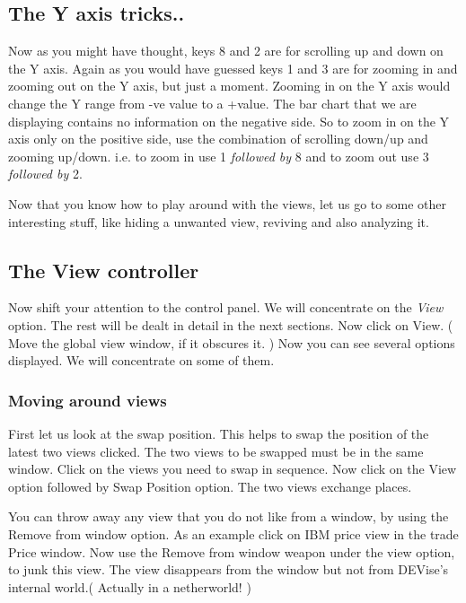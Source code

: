 \subsection{The Y axis tricks..}


	Now as you might have thought, keys 8 and 2 are for scrolling up and down on the Y axis. Again as you would have guessed keys 1 and 3 are for zooming in and zooming out on the Y axis, but just a moment. Zooming in on the Y axis would change the Y range from -ve value to a +value. The bar chart that we are displaying contains no information on the negative side. So to zoom in on the Y axis only on the positive side, use the combination of scrolling down/up and zooming up/down. i.e. to zoom in  use 1 {\em followed by } 8 and to zoom out use 3 {\em followed by } 2.   


	Now that you know how to play around with the views, let us go to some other interesting stuff, like hiding a unwanted view, reviving and also analyzing it.

\subsection{The View controller}

	Now shift your attention to the control panel. We will concentrate on the {\em View } option. The rest will be dealt in detail in the next sections. Now click on View. ( Move the global view window, if it obscures it. ) Now you can see several options displayed. We will concentrate on some of them.

\subsubsection{Moving around views}


	First let us look at the swap position. This helps to swap the position of the latest two views clicked. The two views to be swapped must be in the same window. Click on the views you need to swap in sequence. Now click on the View option followed by Swap Position option. The two views exchange places.


	You can throw away any view that you do not like from a window, by using the Remove from window option. As an example click on IBM price view in the trade Price window. Now use the Remove from window weapon under the view option, to junk this view. The view disappears from the window but not from DEVise's internal world.( Actually in a netherworld! ) 


